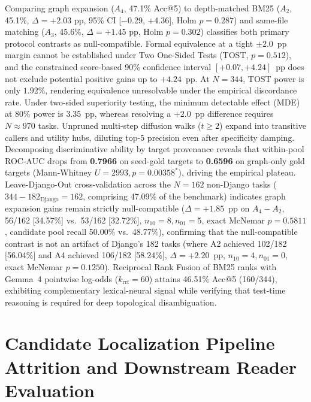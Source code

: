 \documentclass[10pt]{article}
\begin{document}
Comparing graph expansion ($A_4$, 47.1\% Acc@5) to depth-matched BM25 ($A_2$, 45.1\%, $\Delta = +2.03$ pp, 95\% CI [$-$0.29, +4.36], Holm $p=0.287$) and same-file matching ($A_3$, 45.6\%, $\Delta = +1.45$ pp, Holm $p=0.302$) classifies both primary protocol contrasts as null-compatible. Formal equivalence at a tight $\pm 2.0$~pp margin cannot be established under Two One-Sided Tests (TOST, $p=0.512$), and the constrained score-based 90\% confidence interval $[+0.07, +4.24]$~pp does not exclude potential positive gains up to $+4.24$~pp. At $N=344$, TOST power is only $1.92\%$, rendering equivalence unresolvable under the empirical discordance rate. Under two-sided superiority testing, the minimum detectable effect (MDE) at 80\% power is $3.35$~pp, whereas resolving a $+2.0$~pp difference requires $N \approx 970$ tasks. Unpruned multi-step diffusion walks ($t \ge 2$) expand into transitive callers and utility hubs, diluting top-5 precision even after specificity damping. Decomposing discriminative ability by target provenance reveals that within-pool ROC-AUC drops from \textbf{0.7966} on seed-gold targets to \textbf{0.6596} on graph-only gold targets (Mann-Whitney $U = 2993, p = 0.00358^*$), driving the empirical plateau. Leave-Django-Out cross-validation across the $N=162$ non-Django tasks ($344 - 182_{\text{Django}} = 162$, comprising 47.09\% of the benchmark) indicates graph expansion gains remain strictly null-compatible ($\Delta = +1.85$~pp on $A_4 - A_2$, 56/162 [34.57\%] vs.\ 53/162 [32.72\%], $n_{10}=8, n_{01}=5$, exact McNemar $p=0.5811$, candidate pool recall 50.00\% vs.\ 48.77\%), confirming that the null-compatible contrast is not an artifact of Django's 182 tasks (where A2 achieved 102/182 [56.04\%] and A4 achieved 106/182 [58.24\%], $\Delta = +2.20$~pp, $n_{10}=4, n_{01}=0$, exact McNemar $p=0.1250$). Reciprocal Rank Fusion of BM25 ranks with Gemma~4 pointwise log-odds ($k_{\text{rrf}}=60$) attains 46.51\% Acc@5 (160/344), exhibiting complementary lexical-neural signal while verifying that test-time reasoning is required for deep topological disambiguation.

\section{Candidate Localization Pipeline Attrition and Downstream Reader Evaluation}
\label{app:reader_mini_test}
\label{app:reader_test}
\end{document}
